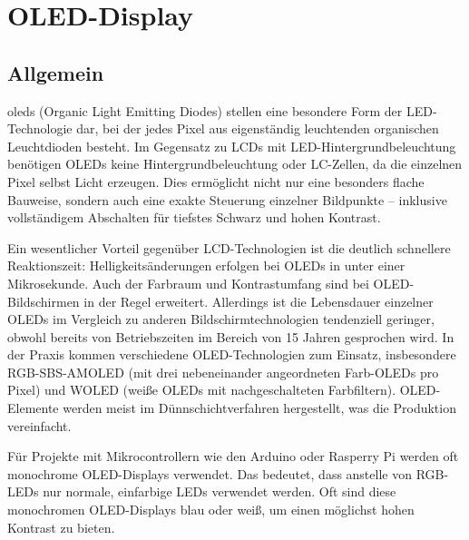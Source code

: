 %
%

\chapter{OLED-Display}\label{sec:OLEDDisplay}
\section{Allgemein}
\ac{oled}s (Organic Light Emitting Diodes) stellen eine besondere Form der LED-Technologie dar, bei der jedes Pixel aus eigenständig leuchtenden organischen Leuchtdioden besteht. Im Gegensatz zu LCDs mit LED-Hintergrundbeleuchtung benötigen OLEDs keine Hintergrundbeleuchtung oder LC-Zellen, da die einzelnen Pixel selbst Licht erzeugen. Dies ermöglicht nicht nur eine besonders flache Bauweise, sondern auch eine exakte Steuerung einzelner Bildpunkte – inklusive vollständigem Abschalten für tiefstes Schwarz und hohen Kontrast.

Ein wesentlicher Vorteil gegenüber LCD-Technologien ist die deutlich schnellere Reaktionszeit: Helligkeitsänderungen erfolgen bei OLEDs in unter einer Mikrosekunde. Auch der Farbraum und Kontrastumfang sind bei OLED-Bildschirmen in der Regel erweitert. Allerdings ist die Lebensdauer einzelner OLEDs im Vergleich zu anderen Bildschirmtechnologien tendenziell geringer, obwohl bereits von Betriebszeiten im Bereich von 15 Jahren gesprochen wird. 
In der Praxis kommen verschiedene OLED-Technologien zum Einsatz, insbesondere RGB-SBS-AMOLED (mit drei nebeneinander angeordneten Farb-OLEDs pro Pixel) und WOLED (weiße OLEDs mit nachgeschalteten Farbfiltern). OLED-Elemente werden meist im Dünnschichtverfahren hergestellt, was die Produktion vereinfacht.\cite{Stotz.2019}

Für Projekte mit Mikrocontrollern wie den Arduino oder Rasperry Pi werden oft monochrome OLED-Displays verwendet. Das bedeutet, dass anstelle von RGB-LEDs nur normale, einfarbige LEDs verwendet werden. Oft sind diese monochromen OLED-Displays blau oder weiß, um einen möglichst hohen Kontrast zu bieten. \cite{Schreiter.2019}



